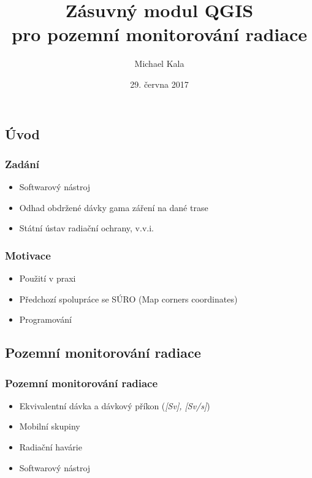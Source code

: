 \documentclass{beamer}
\title{Zásuvný modul QGIS \\pro pozemní monitorování radiace}
\author{Michael Kala}
\date{29. června 2017}
\begin{document}
\begin{frame}
\titlepage
\end{frame}

\begin{frame}
\section{Úvod}
\frametitle{Zadání}

\begin{itemize}

	 

	\item Softwarový nástroj
	\item Odhad obdržené dávky gama záření na dané trase
	\item Státní ústav radiační ochrany, v.v.i.
	 
	

\end{itemize}
\end{frame}

\begin{frame}
\frametitle{Motivace}
\begin{itemize}
	\item Použití v praxi
	\item Předchozí spolupráce se SÚRO (Map corners coordinates)
	\item Programování
	
	
	
\end{itemize}
\end{frame}


\begin{frame}
\section{Pozemní monitorování radiace}
\frametitle{Pozemní monitorování radiace}
\begin{itemize}
	\item Ekvivalentní dávka a dávkový příkon (\textit{[Sv], [Sv/s]})
	\item Mobilní skupiny
	\item Radiační havárie
	\item Softwarový nástroj
		

\end{itemize}
\end{frame}
\end{document}

